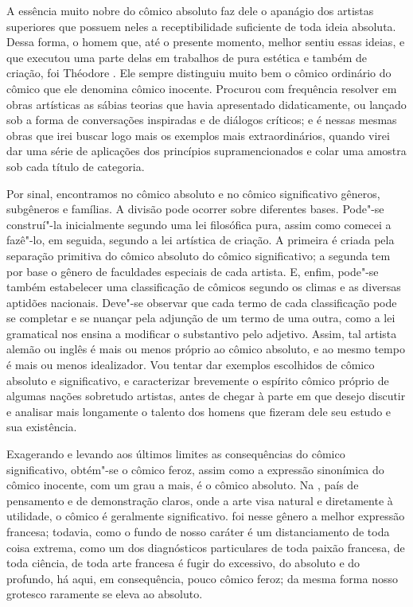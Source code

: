 \sectionitem

A essência muito nobre do cômico absoluto faz dele o apanágio dos
artistas superiores que possuem neles a receptibilidade suficiente de
toda ideia absoluta. Dessa forma, o homem que, até o presente momento,
melhor sentiu essas ideias, e que executou uma parte delas em trabalhos
de pura estética e também de criação, foi Théodore . Ele sempre
distinguiu muito bem o cômico ordinário do cômico que ele denomina
cômico inocente. Procurou com frequência resolver em obras artísticas
as sábias teorias que havia apresentado didaticamente, ou lançado sob a
forma de conversações inspiradas e de diálogos críticos; e é nessas
mesmas obras que irei buscar logo mais os exemplos mais
extraordinários, quando virei dar uma série de aplicações dos
princípios supramencionados e colar uma amostra sob cada título de
categoria.

Por sinal, encontramos no cômico absoluto e no cômico significativo
gêneros, subgêneros e famílias. A divisão pode ocorrer sobre diferentes
bases. Pode"-se construí"-la inicialmente segundo uma lei filosófica
pura, assim como comecei a fazê"-lo, em seguida, segundo a lei artística
de criação. A primeira é criada pela separação primitiva do cômico
absoluto do cômico significativo; a segunda tem por base o gênero de
faculdades especiais de cada artista. E, enfim, pode"-se também
estabelecer uma classificação de cômicos segundo os climas e as
diversas aptidões nacionais. Deve"-se observar que cada termo de cada
classificação pode se completar e se nuançar pela adjunção de um termo
de uma outra, como a lei gramatical nos ensina a modificar o
substantivo pelo adjetivo. Assim, tal artista alemão ou inglês é mais
ou menos próprio ao cômico absoluto, e ao mesmo tempo é mais ou menos
idealizador. Vou tentar dar exemplos escolhidos de cômico absoluto e
significativo, e caracterizar brevemente o espírito cômico próprio de
algumas nações sobretudo artistas, antes de chegar à parte em que
desejo discutir e analisar mais longamente o talento dos homens que
fizeram dele seu estudo e sua existência.

Exagerando e levando aos últimos limites as consequências do cômico
significativo, obtém"-se o cômico feroz, assim como a expressão
sinonímica do cômico inocente, com um grau a mais, é o cômico absoluto.
Na , país de pensamento e de demonstração claros, onde a arte
visa natural e diretamente à utilidade, o cômico é geralmente
significativo.  foi nesse gênero a melhor expressão francesa;
todavia, como o fundo de nosso caráter é um distanciamento de toda
coisa extrema, como um dos diagnósticos particulares de toda paixão
francesa, de toda ciência, de toda arte francesa é fugir do excessivo,
do absoluto e do profundo, há aqui, em consequência, pouco cômico
feroz; da mesma forma nosso grotesco raramente se eleva ao absoluto.

